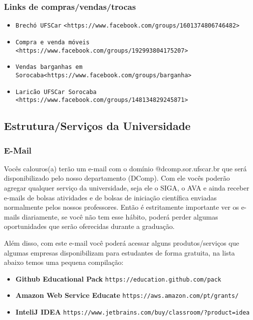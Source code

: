 \subsubsection{Links de compras/vendas/trocas}
  \begin{itemize}
    \item \texttt{Brechó UFSCar} \texttt{<https://www.facebook.com/groups/1601374806746482>}
    \item \texttt{Compra e venda móveis} \texttt{<https://www.facebook.com/groups/192993804175207>}
    \item \texttt{Vendas barganhas em Sorocaba}\texttt{<https://www.facebook.com/groups/barganha>}
    \item \texttt{Laricão UFSCar Sorocaba} \texttt{<https://www.facebook.com/groups/148134829245871>}
  \end{itemize}

\subsection{Estrutura/Serviços da Universidade}

\subsubsection{E-Mail}
Vocês calouros(a) terão um e-mail com o domínio @dcomp.sor.ufscar.br que será disponibilizado pelo nosso departamento (DComp). Com ele vocês poderão agregar qualquer serviço da universidade, seja ele o SIGA, o AVA e ainda receber e-mails de bolsas atividades e de bolsas de iniciação científica enviadas normalmente pelos nossos professores. Então é estritamente importante ver os e-mails diariamente, se você não tem esse hábito, poderá perder algumas oportunidades que serão oferecidas durante a graduação.

Além disso, com este e-mail você poderá acessar alguns produtos/serviços que algumas empresas disponibilizam para estudantes de forma gratuita, na lista abaixo temos uma pequena compilação:
\begin{itemize}
  \item \textbf{Github Educational Pack} \texttt{https://education.github.com/pack}
  \item \textbf{Amazon Web Service Educate} \texttt{https://aws.amazon.com/pt/grants/}
  \item \textbf{InteliJ IDEA} \texttt{https://www.jetbrains.com/buy/classroom/?product=idea}
\end{itemize}

